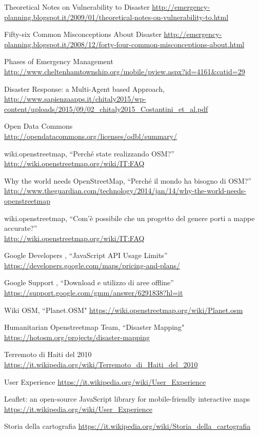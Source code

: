 \begin{thebibliography}{99}

Theoretical Notes on Vulnerability to Disaster
\url{http://emergency-planning.blogspot.it/2009/01/theoretical-notes-on-vulnerability-to.html}

Fifty-six Common Misconceptions About Disaster
\url{http://emergency-planning.blogspot.it/2008/12/forty-four-common-misconceptions-about.html}

Phases of Emergency Management
\url{http://www.cheltenhamtownship.org/mobile/pview.aspx?id=4161&catid=29}

Disaster Response: a Multi-Agent based Approach,
\url{http://www.sapienzaapps.it/chitaly2015/wp-content/uploads/2015/09/02_chitaly2015_Costantini_et_al.pdf}


Open Data Commons  \\
\url{http://opendatacommons.org/licenses/odbl/summary/}

wiki.openstreetmap, ``Perché state realizzando OSM?'' \\
\url{http://wiki.openstreetmap.org/wiki/IT:FAQ}

Why the world needs OpenStreetMap, ``Perché il mondo ha bisogno di OSM?''
\url{http://www.theguardian.com/technology/2014/jan/14/why-the-world-needs-openstreetmap}

wiki.openstreetmap, ``Com'è possibile che un progetto del genere porti a mappe accurate?'' \\
\url{http://wiki.openstreetmap.org/wiki/IT:FAQ}

Google Developers ,  ``JavaScript API Usage Limits''
\url{https://developers.google.com/maps/pricing-and-plans/}


Google Support ,  ``Download e utilizzo di aree offline''
\url{https://support.google.com/gmm/answer/6291838?hl=it}

Wiki OSM,  ``Planet.OSM"
\url{https://wiki.openstreetmap.org/wiki/Planet.osm}

Humanitarian Openstreetmap Team,  ``Disaster Mapping"
\url{https://hotosm.org/projects/disaster-mapping}

Terremoto di Haiti del 2010
\url{https://it.wikipedia.org/wiki/Terremoto_di_Haiti_del_2010}

User Experience
\url{https://it.wikipedia.org/wiki/User_Experience}

Leaflet: an open-source JavaScript library for mobile-friendly interactive maps
\url{https://it.wikipedia.org/wiki/User_Experience}

Storia della cartografia
\url{https://it.wikipedia.org/wiki/Storia_della_cartografia}
 




\end{thebibliography}



